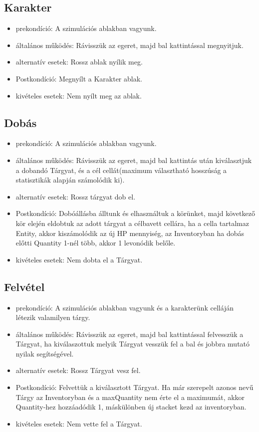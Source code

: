 \subsection{Karakter}

\begin{itemize}
    \item prekondíció: A szimulációs ablakban vagyunk.
    \item általános működés: Rávisszük az egeret, majd bal kattintással megnyitjuk.
    \item alternatív esetek: Rossz ablak nyílik meg.
    \item Postkondíció: Megnyílt a Karakter ablak.
    \item kivételes esetek: Nem nyílt meg az ablak.
\end{itemize}

\subsection{Dobás}

\begin{itemize}
    \item prekondíció: A szimulációs ablakban vagyunk.
    \item általános működés: Rávisszük az egeret, majd bal kattintás után kiválasztjuk a dobandó Tárgyat, és a cél cellát(maximum választható hosszúság a statisztikák alapján számolódik ki).
    \item alternatív esetek: Rossz tárgyat dob el.
    \item Postkondíció: Dobóállásba álltunk és elhasználtuk a körünket, majd következő kör elején eldobtuk az adott tárgyat a célbavett cellára, ha a cella tartalmaz Entity, akkor kiszámolódik az új HP mennyiség, az Inventoryban ha dobás előtti Quantity 1-nél több, akkor 1 levonódik belőle.
    \item kivételes esetek: Nem dobta el a Tárgyat.
\end{itemize}

\subsection{Felvétel}

\begin{itemize}
    \item prekondíció: A szimulációs ablakban vagyunk és a karakterünk celláján létezik valamilyen tárgy.
    \item általános működés: Rávisszük az egeret, majd bal kattintással felvesszük a Tárgyat, ha kiválaszottuk melyik Tárgyat vesszük fel a bal és jobbra mutató nyilak segítségével.
    \item alternatív esetek: Rossz Tárgyat vesz fel.
    \item Postkondíció: Felvettük a kiválasztott Tárgyat. Ha már szerepelt azonos nevű Tárgy az Inventoryban és a maxQuantity nem érte el a maximumát, akkor Quantity-hez hozzáadódik 1, máskülönben új stacket kezd az inventoryban.
    \item kivételes esetek: Nem vette fel a Tárgyat.
\end{itemize}

